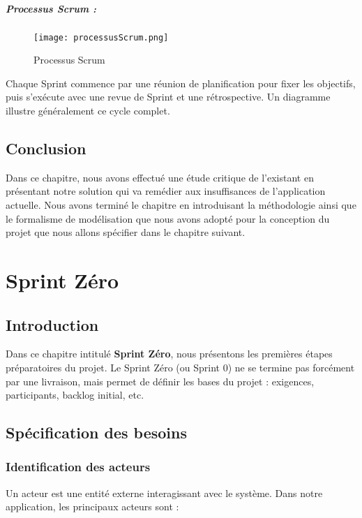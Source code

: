 \documentclass[12pt,a4paper]{report}
\begin{document}
\paragraph{Processus Scrum :}
\begin{figure}[H] 
    \centering
    \texttt{[image: processusScrum.png]}
    \caption{Processus Scrum}
    \label{fig:processusScrum}
\end{figure}
Chaque Sprint commence par une réunion de planification pour fixer les objectifs, puis s’exécute avec une revue de Sprint et une rétrospective. Un diagramme illustre généralement ce cycle complet.
\section{Conclusion}
Dans ce chapitre, nous avons effectué une étude critique de l’existant en présentant notre solution qui va remédier aux insuffisances de l’application actuelle. Nous avons terminé le chapitre en introduisant la méthodologie ainsi que le formalisme de modélisation que nous avons adopté pour la conception du projet que nous allons spécifier dans le chapitre suivant.
\chapter{Sprint Zéro}

\section{Introduction}

Dans ce chapitre intitulé \textbf{Sprint Zéro}, nous présentons les premières étapes préparatoires du projet. Le Sprint Zéro (ou Sprint 0) ne se termine pas forcément par une livraison, mais permet de définir les bases du projet : exigences, participants, backlog initial, etc.

\section{Spécification des besoins}

\subsection{Identification des acteurs}

Un acteur est une entité externe interagissant avec le système. Dans notre application, les principaux acteurs sont :
\end{document}
